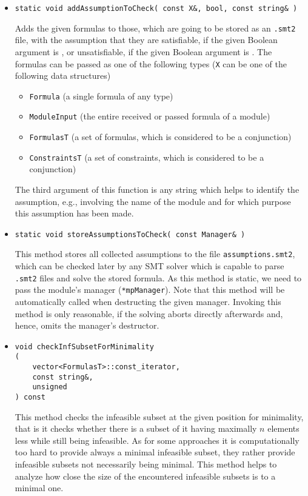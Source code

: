 \begin{itemize}
	\item \begin{verbatim}static void addAssumptionToCheck( const X&, bool, const string& ) \end{verbatim}
		Adds the given formulas to those, which are going to be stored as an \texttt{.smt2} file,
		with the assumption that they are satisfiable, if the given Boolean argument is \true, or unsatisfiable,
		if the given Boolean argument is \false. The formulas can be passed as one of the following types (\texttt{X} can be one of the following data structures)
		\begin{itemize}
		\item \texttt{Formula} (a single formula of any type)
		\item \texttt{ModuleInput} (the entire received or passed formula of a module)
		\item \texttt{FormulasT} (a set of formulas, which is considered to be a conjunction)
		\item \texttt{ConstraintsT} (a set of constraints, which is considered to be a conjunction)
		\end{itemize}
		The third argument of this function is any string which helps to identify the assumption, e.g.,
		involving the name of the module and for which purpose this assumption has been made.
	\item \begin{verbatim}static void storeAssumptionsToCheck( const Manager& )\end{verbatim}
		This method stores all collected assumptions to the file \texttt{assumptions.smt2}, which can be checked
		later by any SMT solver which is capable to parse \texttt{.smt2} files and solve
		the stored formula. As this method is static, we need to pass the module's manager (\texttt{*mpManager}).
		Note that this method will be automatically called when destructing the given manager. Invoking this
		method is only reasonable, if the solving aborts directly afterwards and, hence, omits the manager's
		destructor.
	\item \begin{verbatim}void checkInfSubsetForMinimality
(
    vector<FormulasT>::const_iterator,
    const string&,
    unsigned
) const 
\end{verbatim}
This method checks the infeasible subset at the given position for minimality, that is it checks whether there is a subset of it having maximally $n$ elements less while still being infeasible.
As for some approaches it is computationally too hard to provide always a minimal infeasible subset, they rather provide infeasible subsets not necessarily being minimal. This method helps 
to analyze how close the size of the encountered infeasible subsets is to a minimal one.


\end{itemize}

